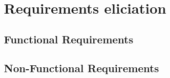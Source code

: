 \section{Requirements eliciation}

\subsection{Functional Requirements}



\subsection{Non-Functional Requirements}

